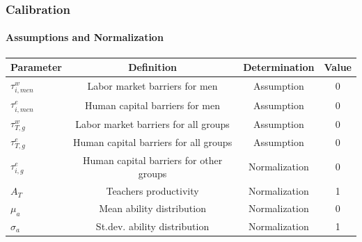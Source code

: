 \documentclass[11pt]{beamer}
\begin{document}
		
		\begin{frame}
			\frametitle{Calibration}
			\framesubtitle{Assumptions and Normalization}
			\scriptsize
			\begin{table}[h!]
				\centering
				\begin{tabular}{lccc}
					\toprule
					\toprule
					Parameter & Definition & Determination & Value\\
					\midrule
					$\tau^{w}_{i,men}$ & Labor market barriers for men & Assumption & 0\\
					$\tau^{e}_{i,men}$ & Human capital barriers for men & Assumption & 0\\
					$\tau^{w}_{T,g}$ & Labor market barriers for all groups & Assumption & 0\\
					$\tau^{e}_{T,g}$ & Human capital barriers for all groups & Assumption & 0\\
					$\tau^{e}_{i,g}$ & Human capital barriers for other groups & Normalization & 0\\
					$A_{T}$ & Teachers productivity & Normalization & 1\\
					$\mu_a$ & Mean ability distribution & Normalization & 0\\
					$\sigma_a$ & St.dev. ability distribution & Normalization & 1\\
					\bottomrule
				\end{tabular}
				\label{tab:assump}
			\end{table}
		\end{frame}
		
\end{document}
